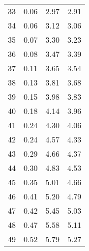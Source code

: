 \begin{longtable}[c]{cccc}
	33                       & 0.06                                    & 2.97                                    & 2.91                       \\
	34                       & 0.06                                    & 3.12                                    & 3.06                       \\
	35                       & 0.07                                    & 3.30                                    & 3.23                       \\
	36                       & 0.08                                    & 3.47                                    & 3.39                       \\
	37                       & 0.11                                    & 3.65                                    & 3.54                       \\
	38                       & 0.13                                    & 3.81                                    & 3.68                       \\
	39                       & 0.15                                    & 3.98                                    & 3.83                       \\
	40                       & 0.18                                    & 4.14                                    & 3.96                       \\
	41                       & 0.24                                    & 4.30                                    & 4.06                       \\
	42                       & 0.24                                    & 4.57                                    & 4.33                       \\
	43                       & 0.29                                    & 4.66                                    & 4.37                       \\
	44                       & 0.30                                    & 4.83                                    & 4.53                       \\
	45                       & 0.35                                    & 5.01                                    & 4.66                       \\
	46                       & 0.41                                    & 5.20                                    & 4.79                       \\
	47                       & 0.42                                    & 5.45                                    & 5.03                       \\
	48                       & 0.47                                    & 5.58                                    & 5.11                       \\
	49                       & 0.52                                    & 5.79                                    & 5.27                       \\

\end{longtable}

